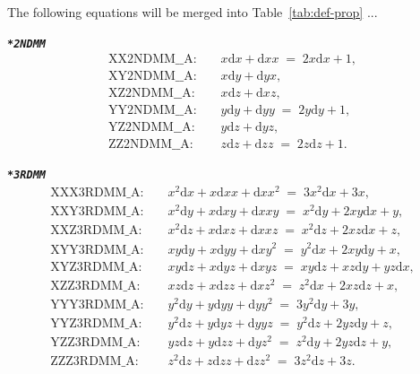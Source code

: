 \documentclass[a4paper,11pt,twoside,openright]{book}
\newcommand{\fixme}[1]{\textbf{\textit{\color{red} #1}}}
\begin{document}
\begin{landscape}
\begin{center}
\end{center}

\clearpage

\end{landscape}

The following equations will be merged into Table~\ref{tab:def-prop} ...

\fixme{\texttt{*2NDMM}
\begin{eqnarray}
  \text{XX2NDMM\_\_A: } && x\mathrm{d}x + \mathrm{d}x x \;=\; 2x\mathrm{d}x + 1,\\
  \text{XY2NDMM\_\_A: } && x\mathrm{d}y + \mathrm{d}y x,\\
  \text{XZ2NDMM\_\_A: } && x\mathrm{d}z + \mathrm{d}x z,\\
  \text{YY2NDMM\_\_A: } && y\mathrm{d}y + \mathrm{d}y y \;=\; 2y\mathrm{d}y + 1,\\
  \text{YZ2NDMM\_\_A: } && y\mathrm{d}z + \mathrm{d}y z,\\
  \text{ZZ2NDMM\_\_A: } && z\mathrm{d}z + \mathrm{d}z z \;=\; 2z\mathrm{d}z + 1.
\end{eqnarray}}

\fixme{\texttt{*3RDMM}
\begin{eqnarray}
  \text{XXX3RDMM\_A: } && x^2\mathrm{d}x + x\mathrm{d}x x + \mathrm{d}x x^2 \;=\; 3x^2\mathrm{d}x + 3x,\\ 
  \text{XXY3RDMM\_A: } && x^2\mathrm{d}y + x\mathrm{d}x y + \mathrm{d}x xy \;=\; x^2\mathrm{d}y + 2xy\mathrm{d}x + y,\\
  \text{XXZ3RDMM\_A: } && x^2\mathrm{d}z + x\mathrm{d}x z + \mathrm{d}x xz \;=\; x^2\mathrm{d}z + 2xz\mathrm{d}x + z,\\
  \text{XYY3RDMM\_A: } && xy\mathrm{d}y + x\mathrm{d}y y + \mathrm{d}x y^2 \;=\; y^2\mathrm{d}x + 2xy\mathrm{d}y + x,\\
  \text{XYZ3RDMM\_A: } && xy\mathrm{d}z + x\mathrm{d}y z + \mathrm{d}x yz \;=\; xy\mathrm{d}z + xz\mathrm{d}y + yz\mathrm{d}x,\\
  \text{XZZ3RDMM\_A: } && xz\mathrm{d}z + x\mathrm{d}z z + \mathrm{d}x z^2 \;=\; z^2\mathrm{d}x + 2xz\mathrm{d}z + x,\\
  \text{YYY3RDMM\_A: } && y^2\mathrm{d}y + y\mathrm{d}y y + \mathrm{d}y y^2 \;=\; 3y^2\mathrm{d}y + 3y,\\
  \text{YYZ3RDMM\_A: } && y^2\mathrm{d}z + y\mathrm{d}y z + \mathrm{d}y yz \;=\; y^2\mathrm{d}z + 2yz\mathrm{d}y + z,\\
  \text{YZZ3RDMM\_A: } && yz\mathrm{d}z + y\mathrm{d}z z + \mathrm{d}y z^2 \;=\; z^2\mathrm{d}y + 2yz\mathrm{d}z + y,\\
  \text{ZZZ3RDMM\_A: } && z^2\mathrm{d}z + z\mathrm{d}z z + \mathrm{d}z z^2 \;=\; 3z^2\mathrm{d}z + 3z.
\end{eqnarray}}
\end{document}
